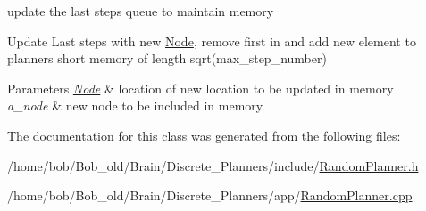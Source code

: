 update the last steps queue to maintain memory 

Update Last steps with new \hyperlink{structNode}{Node}, remove first in and add new element to planners short memory of length sqrt(max\+\_\+step\+\_\+number)


\begin{DoxyParams}{Parameters}
{\em \hyperlink{structNode}{Node}} & location of new location to be updated in memory\\
\hline
{\em a\+\_\+node} & new node to be included in memory \\
\hline
\end{DoxyParams}


The documentation for this class was generated from the following files\+:\begin{DoxyCompactItemize}
\item 
/home/bob/\+Bob\+\_\+old/\+Brain/\+Discrete\+\_\+\+Planners/include/\hyperlink{RandomPlanner_8h}{Random\+Planner.\+h}\item 
/home/bob/\+Bob\+\_\+old/\+Brain/\+Discrete\+\_\+\+Planners/app/\hyperlink{RandomPlanner_8cpp}{Random\+Planner.\+cpp}\end{DoxyCompactItemize}
